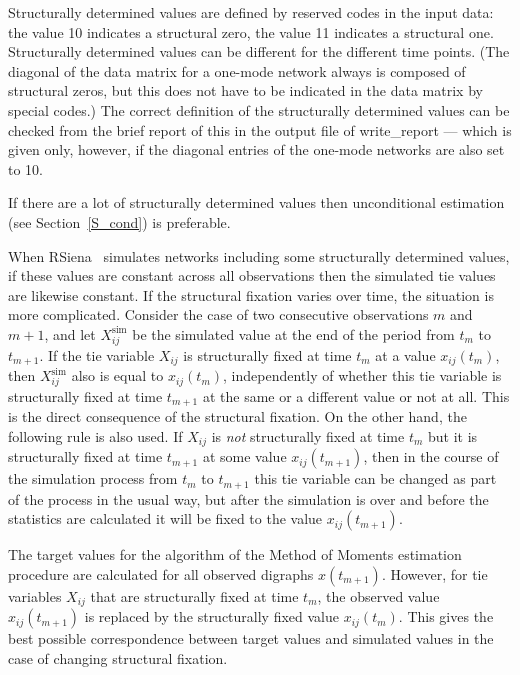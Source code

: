 \documentclass[a4paper,fleqn,11pt]{article}
\newcommand{\+}{\, + \,}
\newcommand{\RS}{{\sf \textsf{RSiena} }}
\begin{document}
Structurally determined values are defined by reserved codes in
the input data: the value 10 indicates a structural zero, the
value 11 indicates a structural one. Structurally determined
values can be different for the different time points. (The
diagonal of the data matrix for a one-mode network
always is composed of structural
zeros, but this does not have to be indicated in the data matrix
by special codes.) The correct definition of the structurally
determined values can be checked from the brief report of this in
the output file of \textsf{write\_report} --- which is given only,
however, if the diagonal entries of the one-mode networks are also
set to 10.

If there are a lot of structurally determined values
then unconditional estimation  (see Section~\ref{S_cond})
is preferable.

When \RS\ simulates networks including some structurally determined values,
if these values are constant across all observations then
the simulated tie values are likewise constant.
If the structural fixation varies over time, the situation
is more complicated.
Consider the case of two consecutive observations
$m$ and $m+1$,
and let $X^{\text{sim}}_{ij}$ be the simulated value
at the end of the period from $t_m$ to $t_{m+1}$.
If the tie variable $X_{ij}$ is structurally fixed at time $t_m$
at a value $x_{ij}(t_m)$,
then $X^{\text{sim}}_{ij}$ also is equal to $x_{ij}(t_m)$,
independently of whether this tie variable is structurally fixed
at time $t_{m+1}$ at the same or a different value or not at all.
This is the direct consequence of the structural fixation.
On the other hand, the following rule is also used.
If $X_{ij}$ is \emph{not} structurally fixed at time $t_m$
but it is structurally fixed at time $t_{m+1}$ at some value $x_{ij}(t_{m+1})$,
then in the course of the simulation process from  $t_m$ to $t_{m+1}$
this tie variable can be changed as part of the process in the usual way,
but after the simulation is over and before the statistics are calculated it will be fixed
to the value $x_{ij}(t_{m+1})$.

The target values for the algorithm of the Method of Moments estimation
procedure are calculated for all observed digraphs $x(t_{m+1})$.
However, for tie variables $X_{ij}$ that are
structurally fixed at time $t_m$, the observed value  $x_{ij}(t_{m+1})$
is replaced by the structurally fixed value  $x_{ij}(t_{m})$.
This gives the best possible correspondence between target values
and simulated values in the case of changing structural fixation.
\end{document}
